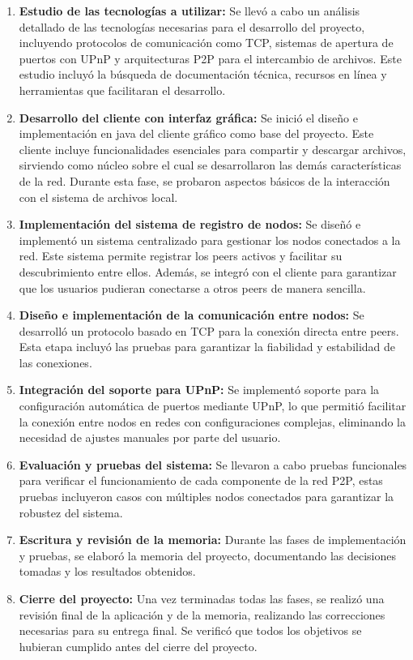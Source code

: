 \begin{enumerate}

    \item \textbf{Estudio de las tecnologías a utilizar:}
    Se llevó a cabo un análisis detallado de las tecnologías necesarias para el desarrollo del proyecto, incluyendo protocolos de comunicación como TCP,
    sistemas de apertura de puertos con UPnP y arquitecturas P2P para el intercambio de archivos.
    Este estudio incluyó la búsqueda de documentación técnica, recursos en línea y herramientas que facilitaran el desarrollo.

    \item \textbf{Desarrollo del cliente con interfaz gráfica:}
    Se inició el diseño e implementación en java del cliente gráfico como base del proyecto.
    Este cliente incluye funcionalidades esenciales para compartir y descargar archivos, sirviendo como núcleo sobre el cual se desarrollaron las demás características de la red.
    Durante esta fase, se probaron aspectos básicos de la interacción con el sistema de archivos local.

    \item \textbf{Implementación del sistema de registro de nodos:}
    Se diseñó e implementó un sistema centralizado para gestionar los nodos conectados a la red.
    Este sistema permite registrar los peers activos y facilitar su descubrimiento entre ellos.
    Además, se integró con el cliente para garantizar que los usuarios pudieran conectarse a otros peers de manera sencilla.

    \item \textbf{Diseño e implementación de la comunicación entre nodos:}
    Se desarrolló un protocolo basado en TCP para la conexión directa entre peers.
    Esta etapa incluyó las pruebas para garantizar la fiabilidad y estabilidad de las conexiones.

    \item \textbf{Integración del soporte para UPnP:}
    Se implementó soporte para la configuración automática de puertos mediante UPnP, lo que permitió facilitar la conexión entre nodos en redes con configuraciones complejas,
    eliminando la necesidad de ajustes manuales por parte del usuario.

    \item \textbf{Evaluación y pruebas del sistema:}
    Se llevaron a cabo pruebas funcionales para verificar el funcionamiento de cada componente de la red P2P,
    estas pruebas incluyeron casos con múltiples nodos conectados para garantizar la robustez del sistema.

    \item \textbf{Escritura y revisión de la memoria:}
    Durante las fases de implementación y pruebas, se elaboró la memoria del proyecto, documentando las decisiones tomadas y los resultados obtenidos.

    \item \textbf{Cierre del proyecto:}
    Una vez terminadas todas las fases, se realizó una revisión final de la aplicación y de la memoria, realizando las correcciones necesarias para su entrega final.
    Se verificó que todos los objetivos se hubieran cumplido antes del cierre del proyecto.
\end{enumerate}

